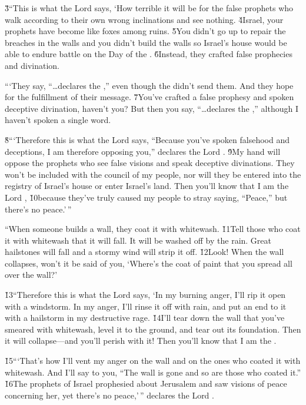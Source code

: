 \v{3}``This is what the Lord  says, `How terrible it will be for the false prophets who walk according to their own wrong inclinations and see nothing. \v{4}Israel, your prophets have become like foxes among ruins. \v{5}You didn't go up to repair the breaches in the walls and you didn't build the walls so Israel's house would be able to endure battle on the Day of the . \v{6}Instead, they crafted false prophecies and divination.

```They say, ``{\ldots}declares the ,'' even though the  didn't send them. And they hope for the fulfillment of their message. \v{7}You've crafted a false prophesy and spoken deceptive divination, haven't you? But then you say, ``{\ldots}declares the ,'' although I haven't spoken a single word.

\v{8}```Therefore this is what the Lord  says, ``Because you've spoken falsehood and deceptions, I am therefore opposing you,'' declares the Lord . \v{9}My hand will oppose the prophets who see false visions and speak deceptive divinations. They won't be included with the council of my people, nor will they be entered into the registry of Israel's house or enter Israel's land. Then you'll know that I am the Lord , \v{10}because they've truly caused my people to stray saying, ``Peace,'' but there's no peace.'\,''

``When someone builds a wall, they coat it with whitewash. \v{11}Tell those who coat it with whitewash that it will fall. It will be washed off by the rain. Great hailstones will fall and a stormy wind will strip it off. \v{12}Look! When the wall collapses, won't it be said of you, `Where's the coat of paint that you spread all over the wall?'

\v{13}``Therefore this is what the Lord  says, `In my burning anger, I'll rip it open with a windstorm. In my anger, I'll rinse it off with rain, and put an end to it with a hailstorm in my destructive rage. \v{14}I'll tear down the wall that you've smeared with whitewash, level it to the ground, and tear out its foundation. Then it will collapse---and you'll perish with it! Then you'll know that I am the .

\v{15}```That's how I'll vent my anger on the wall and on the ones who coated it with whitewash. And I'll say to you, ``The wall is gone and so are those who coated it.'' \v{16}The prophets of Israel prophesied about Jerusalem and saw visions of peace concerning her, yet there's no peace,'\,'' declares the Lord .

